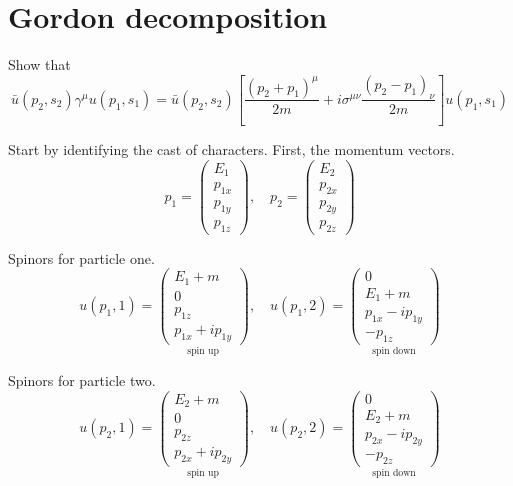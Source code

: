 

\section*{Gordon decomposition}

Show that
\begin{equation*}
\bar{u}(p_2,s_2)\gamma^\mu u(p_1,s_1)=
\bar{u}(p_2,s_2)
\left[
\frac{(p_2+p_1)^\mu}{2m}+i\sigma^{\mu\nu}\frac{(p_2-p_1)_\nu}{2m}
\right]
u(p_1,s_1)
\end{equation*}

Start by identifying the cast of characters.
First, the momentum vectors.
\begin{equation*}
p_1=\begin{pmatrix}E_1\\p_{1x}\\p_{1y}\\p_{1z}\end{pmatrix},\quad
p_2=\begin{pmatrix}E_2\\p_{2x}\\p_{2y}\\p_{2z}\end{pmatrix}
\end{equation*}

Spinors for particle one.
\begin{equation*}
u(p_1,1)=\underset{\text{spin up}}
{\begin{pmatrix}E_1+m\\0\\p_{1z}\\p_{1x}+ip_{1y}\end{pmatrix}},\quad
u(p_1,2)=\underset{\text{spin down}}
{\begin{pmatrix}0\\E_1+m\\p_{1x}-ip_{1y}\\-p_{1z}\end{pmatrix}}
\end{equation*}

Spinors for particle two.
\begin{equation*}
u(p_2,1)=\underset{\text{spin up}}
{\begin{pmatrix}E_2+m\\0\\p_{2z}\\p_{2x}+ip_{2y}\end{pmatrix}},\quad
u(p_2,2)=\underset{\text{spin down}}
{\begin{pmatrix}0\\E_2+m\\p_{2x}-ip_{2y}\\-p_{2z}\end{pmatrix}}
\end{equation*}

